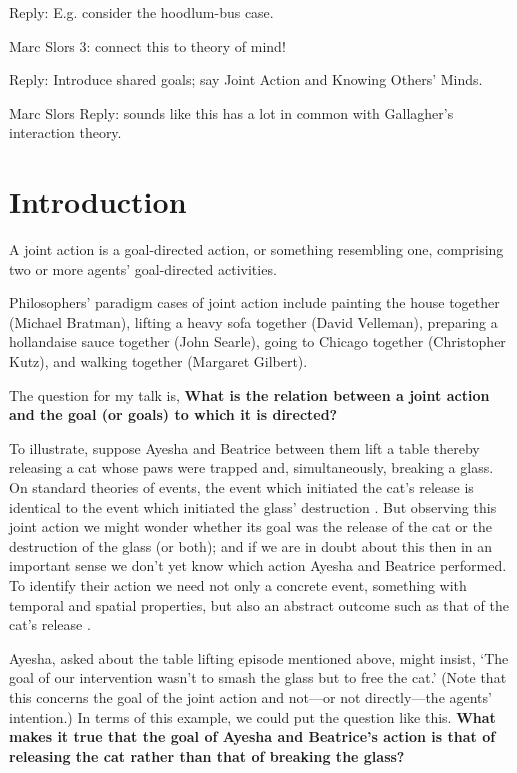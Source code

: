\documentclass[12pt,a4paper]{extarticle}
\begin{document}
Reply: E.g. consider the hoodlum-bus case.


Marc Slors 3: connect this to theory of mind!  

Reply: Introduce shared goals; say Joint Action and Knowing Others' Minds.

Marc Slors Reply: sounds like this has a lot in common with Gallagher's interaction theory.  



\section{Introduction}
A joint action is a goal-directed action, or something resembling one, comprising two or more agents' goal-directed activities. 

Philosophers' paradigm cases of joint action include painting the house together (Michael Bratman), lifting a heavy sofa together (David Velleman), preparing a hollandaise sauce together (John Searle), going to Chicago together (Christopher Kutz), and walking together (Margaret Gilbert).

The question for my talk is, \textbf{What is the relation between a joint action and the goal (or goals) to which it is directed?}  

To illustrate, suppose Ayesha and Beatrice between them lift a table thereby releasing a cat whose paws were trapped and,  simultaneously, breaking a glass.  On standard theories of events, the event which initiated the cat's release is identical to the event which initiated the glass' destruction \citep{Davidson:1969ie}.  But observing this joint action we might wonder whether its goal was the release of the cat or the destruction of the glass (or both); and if we are in doubt about this then in an important sense we don't yet know which action Ayesha and Beatrice performed.  To identify their action we need not only a concrete event, something with temporal and spatial properties, but also an abstract outcome such as that of the cat's release \citep{Davidson:1971fz}.

Ayesha, asked about the table lifting episode mentioned above, might insist, `The goal of our intervention wasn't to smash the glass but to free the cat.'  (Note that this concerns the goal of the joint action and not---or not directly---the agents' intention.)  In terms of this example, we could put the question like this.  \textbf{What makes it true that the goal of Ayesha and Beatrice's action is that of releasing the cat rather than that of breaking the glass?}
\end{document}
